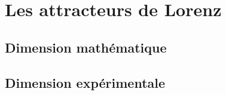 \chapter{Les attracteurs de Lorenz}

\section{Dimension mathématique}

\section{Dimension expérimentale}